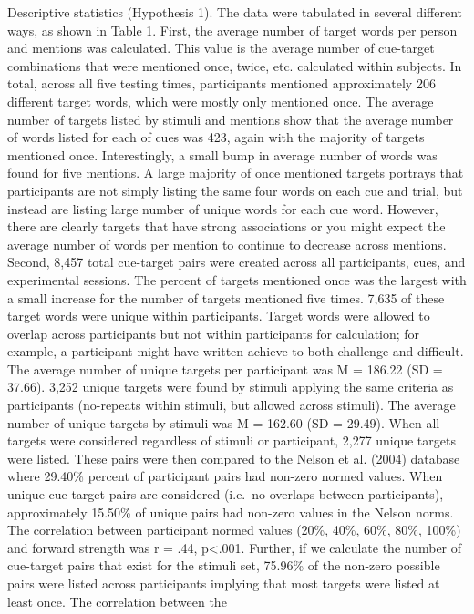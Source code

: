 \documentclass[english,man]{apa6}
\theoremstyle{definition}
\theoremstyle{definition}
\theoremstyle{definition}
\theoremstyle{remark}
\begin{document}
Descriptive statistics (Hypothesis 1). The data were tabulated in
several different ways, as shown in Table 1. First, the average number
of target words per person and mentions was calculated. This value is
the average number of cue-target combinations that were mentioned once,
twice, etc. calculated within subjects. In total, across all five
testing times, participants mentioned approximately 206 different target
words, which were mostly only mentioned once. The average number of
targets listed by stimuli and mentions show that the average number of
words listed for each of cues was 423, again with the majority of
targets mentioned once. Interestingly, a small bump in average number of
words was found for five mentions. A large majority of once mentioned
targets portrays that participants are not simply listing the same four
words on each cue and trial, but instead are listing large number of
unique words for each cue word. However, there are clearly targets that
have strong associations or you might expect the average number of words
per mention to continue to decrease across mentions. Second, 8,457 total
cue-target pairs were created across all participants, cues, and
experimental sessions. The percent of targets mentioned once was the
largest with a small increase for the number of targets mentioned five
times. 7,635 of these target words were unique within participants.
Target words were allowed to overlap across participants but not within
participants for calculation; for example, a participant might have
written achieve to both challenge and difficult. The average number of
unique targets per participant was M = 186.22 (SD = 37.66). 3,252 unique
targets were found by stimuli applying the same criteria as participants
(no-repeats within stimuli, but allowed across stimuli). The average
number of unique targets by stimuli was M = 162.60 (SD = 29.49). When
all targets were considered regardless of stimuli or participant, 2,277
unique targets were listed. These pairs were then compared to the Nelson
et al. (2004) database where 29.40\% percent of participant pairs had
non-zero normed values. When unique cue-target pairs are considered
(i.e.~no overlaps between participants), approximately 15.50\% of unique
pairs had non-zero values in the Nelson norms. The correlation between
participant normed values (20\%, 40\%, 60\%, 80\%, 100\%) and forward
strength was r = .44, p\textless{}.001. Further, if we calculate the
number of cue-target pairs that exist for the stimuli set, 75.96\% of
the non-zero possible pairs were listed across participants implying
that most targets were listed at least once. The correlation between the
\end{document}
